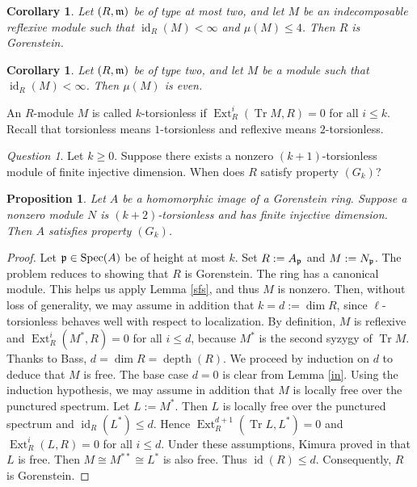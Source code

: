 \documentclass[10. pt,a4paper]{amsart}
\newtheorem{proposition}[theorem]{Proposition}
\newtheorem{corollary}[theorem]{Corollary}
\theoremstyle{definition}
\theoremstyle{remark}
\newtheorem{question}[theorem]{Question}
\newcommand{\Spec}{\operatorname{Spec}}
\newcommand{\Tr}{\operatorname{Tr}}
\newcommand{\id}{\operatorname{id}}
\newcommand{\Ext}{\operatorname{Ext}}
\newcommand{\depth}{\operatorname{depth}}
\newcommand{\fm}{\frak{m}}
\newcommand{\fp}{\frak{p}}
\begin{document}
\begin{corollary}
	Let $(R,\fm)$ be of type at most two, and let $M$ be an indecomposable reflexive module such that $\id_R(M) < \infty$ and $\mu(M) \leq 4$. Then $R$ is Gorenstein.
\end{corollary}

\begin{corollary}\label{cor7.7}
	Let $(R,\fm)$ be of type two, and let $M$ be a module such that $\id_R(M) < \infty$. Then $\mu(M)$ is even.
\end{corollary}

An $R$-module $M$ is called $k$-torsionless if $\Ext_R^i(\Tr M, R) = 0$ for all $i \leq k$. Recall that torsionless means $1$-torsionless and reflexive means $2$-torsionless. 

\begin{question}
	Let $k \geq 0$. Suppose there exists a nonzero $(k+1)$-torsionless module of finite injective dimension. When does $R$ satisfy property $(G_k)$?
\end{question}

\begin{proposition}\label{remf}
	Let $A$ be a homomorphic image of a Gorenstein ring. Suppose a nonzero module $N$ is $(k+2)$-torsionless and has finite injective dimension. Then $A$ satisfies property $(G_k)$.
\end{proposition}

\begin{proof}
	Let $\fp \in \Spec(A)$ be of height at most $k$. Set $R := A_{\fp}$ and $M := N_{\fp}$. The problem reduces to showing that $R$ is Gorenstein. The ring has a canonical module. This helps us apply Lemma \ref{sfs}, and thus $M$ is nonzero. Then, without loss of generality, we may assume in addition that $k = d := \dim R$, since $\ell$-torsionless behaves well with respect to localization. By definition, $M$ is reflexive and $\Ext_R^i(M^\ast, R) = 0$ for all $i \leq d$, because $M^\ast$ is the second syzygy of $\Tr M$. Thanks to Bass, $d = \dim R = \depth(R)$. We proceed by induction on $d$ to deduce that $M$ is free. The base case $d = 0$ is clear from Lemma \ref{in}. Using the induction hypothesis, we may assume in addition that $M$ is locally free over the punctured spectrum. Let $L := M^\ast$. Then $L$ is locally free over the punctured spectrum and $\id_R(L^\ast) \leq d$. Hence $\Ext_R^{d+1}(\Tr L, L^\ast) = 0$ and $\Ext_R^i(L, R) = 0$ for all $i \leq d$. Under these assumptions, Kimura proved in \cite[Theorem 2.4]{kim} that $L$ is free. Then $M \cong M^{\ast\ast} \cong L^\ast$ is also free. Thus $\id(R) \leq d$. Consequently, $R$ is Gorenstein.
\end{proof}
\end{document}
